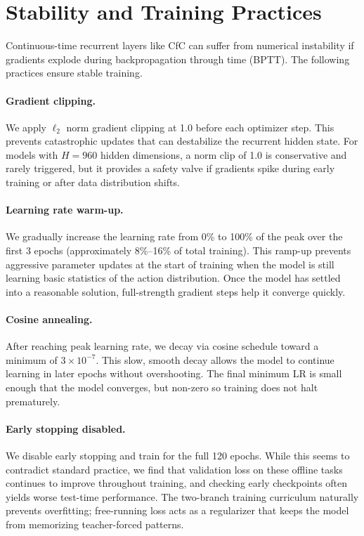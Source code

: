 \documentclass{article}
\begin{document}
\section{Stability and Training Practices}

Continuous-time recurrent layers like CfC can suffer from numerical instability if gradients explode during backpropagation through time (BPTT). The following practices ensure stable training.

\paragraph{Gradient clipping.}
We apply $\ell_2$ norm gradient clipping at 1.0 before each optimizer step. This prevents catastrophic updates that can destabilize the recurrent hidden state. For models with $H=960$ hidden dimensions, a norm clip of 1.0 is conservative and rarely triggered, but it provides a safety valve if gradients spike during early training or after data distribution shifts.

\paragraph{Learning rate warm-up.}
We gradually increase the learning rate from 0\% to 100\% of the peak over the first 3 epochs (approximately 8\%--16\% of total training). This ramp-up prevents aggressive parameter updates at the start of training when the model is still learning basic statistics of the action distribution. Once the model has settled into a reasonable solution, full-strength gradient steps help it converge quickly.

\paragraph{Cosine annealing.}
After reaching peak learning rate, we decay via cosine schedule toward a minimum of $3 \times 10^{-7}$. This slow, smooth decay allows the model to continue learning in later epochs without overshooting. The final minimum LR is small enough that the model converges, but non-zero so training does not halt prematurely.

\paragraph{Early stopping disabled.}
We disable early stopping and train for the full 120 epochs. While this seems to contradict standard practice, we find that validation loss on these offline tasks continues to improve throughout training, and checking early checkpoints often yields worse test-time performance. The two-branch training curriculum naturally prevents overfitting; free-running loss acts as a regularizer that keeps the model from memorizing teacher-forced patterns.
\end{document}

